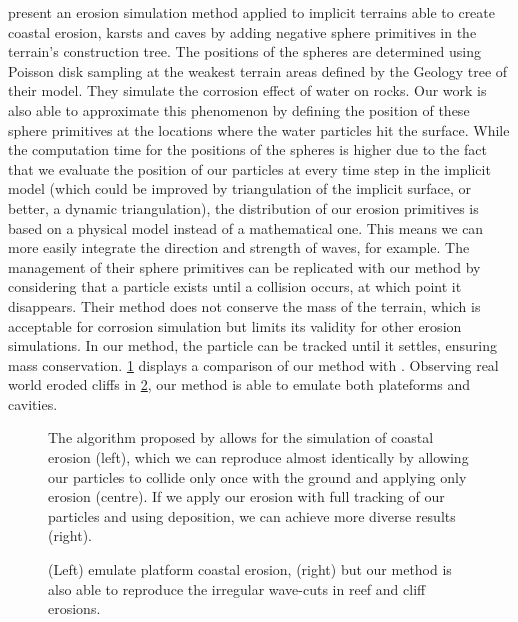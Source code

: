 \cite{Paris2019b} present an erosion simulation method applied to implicit terrains able to create coastal erosion, karsts and caves by adding negative sphere primitives in the terrain's construction tree. The positions of the spheres are determined using Poisson disk sampling at the weakest terrain areas defined by the Geology tree of their model. They simulate the corrosion effect of water on rocks. Our work is also able to approximate this phenomenon by defining the position of these sphere primitives at the locations where the water particles hit the surface. While the computation time for the positions of the spheres is higher due to the fact that we evaluate the position of our particles at every time step in the implicit model (which could be improved by triangulation of the implicit surface, or better, a dynamic triangulation), the distribution of our erosion primitives is based on a physical model instead of a mathematical one. This means we can more easily integrate the direction and strength of waves, for example. The management of their sphere primitives can be replicated with our method by considering that a particle exists until a collision occurs, at which point it disappears. Their method does not conserve the mass of the terrain, which is acceptable for corrosion simulation but limits its validity for other erosion simulations. In our method, the particle can be tracked until it settles, ensuring mass conservation. \cref{fig:erosion-screen-paris2019-1} displays a comparison of our method with \cite{Paris2019b}. Observing real world eroded cliffs in \cref{fig:erosion-real-world-coastal}, our method is able to emulate both plateforms and cavities. 

\begin{figure}[H]
    \caption{The algorithm proposed by \cite{Paris2019b} allows for the simulation of coastal erosion (left), which we can reproduce almost identically by allowing our particles to collide only once with the ground and applying only erosion (centre). If we apply our erosion with full tracking of our particles and using deposition, we can achieve more diverse results (right).}
    \label{fig:erosion-screen-paris2019-1}
\end{figure}
\begin{figure}[H]
    \caption{(Left) \cite{Paris2019a} emulate platform coastal erosion, (right) but our method is also able to reproduce the irregular wave-cuts in reef and cliff erosions.}
    \label{fig:erosion-real-world-coastal}
\end{figure}

